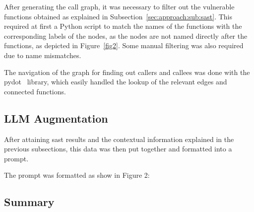 After generating the call graph, it was necessary to filter out the vulnerable functions obtained as explained in Subsection~\ref{sec:approach:sub:sast}. 
This required at first a Python script to match the names of the functions with the corresponding labels of the nodes, as the nodes are not named directly after the functions, as depicted in Figure~\ref{fig2}. 
Some manual filtering was also required due to name mismatches.

The navigation of the graph for finding out callers and callees was done with the pydot~\cite{pydot} library, which easily handled the lookup of the relevant edges and connected functions.

\subsection{LLM Augmentation}
\label{sec:approach:sub:llm}
After attaining \ac{sast} results and the contextual information explained in the previous subsections, this data was then put together and formatted into a prompt.

The prompt was formatted as show in Figure 2:

\subsection{Summary}
\label{sec:approach:sub:summary}